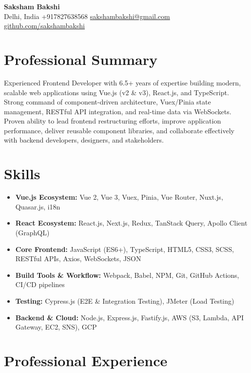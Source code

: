 \documentclass[a4paper,10pt]{article}
\begin{document}
\pagestyle{empty}

\begin{center}
    {\Huge \textbf{Saksham Bakshi}} \\[0.5ex]
    Delhi, India \textbar{} +917827638568 \textbar{} \href{mailto:sakshambakshi@gmail.com}{sakshambakshi@gmail.com} \textbar{} \href{https://github.com/sakshambakshi}{github.com/sakshambakshi}
\end{center}

\section*{Professional Summary}
Experienced Frontend Developer with 6.5+ years of expertise building modern, scalable web applications using Vue.js (v2 \& v3), React.js, and TypeScript. Strong command of component-driven architecture, Vuex/Pinia state management, RESTful API integration, and real-time data via WebSockets. Proven ability to lead frontend restructuring efforts, improve application performance, deliver reusable component libraries, and collaborate effectively with backend developers, designers, and stakeholders.

\section*{Skills}
\begin{itemize}[leftmargin=*,itemsep=2pt,parsep=0pt]
    \item \textbf{Vue.js Ecosystem:} Vue 2, Vue 3, Vuex, Pinia, Vue Router, Nuxt.js, Quasar.js, i18n
    \item \textbf{React Ecosystem:} React.js, Next.js, Redux, TanStack Query, Apollo Client (GraphQL)
    \item \textbf{Core Frontend:} JavaScript (ES6+), TypeScript, HTML5, CSS3, SCSS, RESTful APIs, Axios, WebSockets, JSON
    \item \textbf{Build Tools \& Workflow:} Webpack, Babel, NPM, Git, GitHub Actions, CI/CD pipelines
    \item \textbf{Testing:} Cypress.js (E2E \& Integration Testing), JMeter (Load Testing)
    \item \textbf{Backend \& Cloud:} Node.js, Express.js, Fastify.js, AWS (S3, Lambda, API Gateway, EC2, SNS), GCP
\end{itemize}

\section*{Professional Experience}
\end{document}
